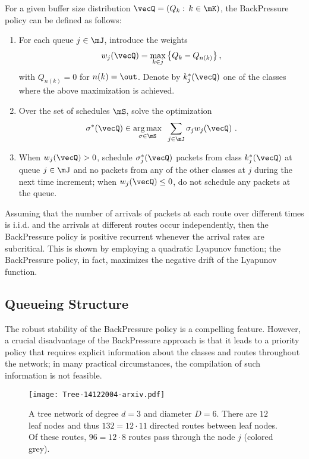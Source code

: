 \documentclass{amsart}
\begin{document}
For a given buffer size distribution $\vecQ=(Q_k: \, k\in\mK)$, the BackPressure policy can be defined as follows:
\begin{enumerate}
\item For each queue $j \in \mJ$, introduce the weights 
\begin{equation}\label{BPwOpt}
w_j(\vecQ)= \max_{k \in j} \left\{   Q_k - Q_{n(k)}\right\},
\end{equation}
with $Q_{n(k)}= 0$ for $n(k)=\out$.  
Denote by $k^*_j(\vecQ)$ one of the classes where the above maximization is achieved.
\item Over the set of schedules $\mS$, solve the optimization
\begin{equation}\label{BPOpt}
\sigma^*(\vecQ) \in \operatorname*{arg\,max}_{\sigma\in\mS} \;\; \sum_{j \in \mJ} \sigma_j w_j(\vecQ) \ .
\end{equation}
\item When $w_j(\vecQ)>0$,  schedule $\sigma_j^*(\vecQ)$ packets from class $k^*_j(\vecQ)$ at queue $j \in \mJ$ and no packets from any of the other classes at $j$ during the next time increment; 
when $w_j(\vecQ)\le 0$, do not schedule any packets at the queue.
\end{enumerate}
 
Assuming that the number of  arrivals of packets at each route  over different times is i.i.d. and the arrivals at different routes occur independently, then    
the BackPressure policy is positive recurrent whenever 
the arrival rates are subcritical.
This is shown by employing a quadratic Lyapunov function;
the BackPressure policy, in fact, maximizes the negative drift of
the Lyapunov function. 

\subsection{Queueing Structure}
\label{QueueingS}
The robust stability of the BackPressure policy is a compelling feature. However, a crucial disadvantage of the BackPressure approach is that it leads to a priority policy that requires explicit information about the classes and routes throughout the network; in many practical circumstances, the compilation of such information is not feasible.
\begin{figure}[h!]
  \centering
\texttt{[image: Tree-14122004-arxiv.pdf]}
\caption{A tree network of degree $d=3$ and diameter $D=6$. There are $12$ leaf nodes and thus $132= 12\cdot 11$ directed routes between leaf nodes. Of these routes, $96=12\cdot 8$ routes pass through the node $j$ (colored grey).
\label{Tree} }
\end{figure}
\end{document}
